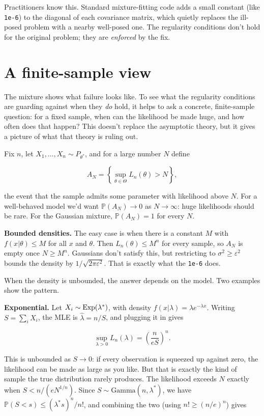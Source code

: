 \documentclass{article}
\begin{document}
Practitioners know this. Standard mixture-fitting code adds a small constant (like \texttt{1e-6}) to the diagonal of each covariance matrix, which quietly replaces the ill-posed problem with a nearby well-posed one. The regularity conditions don't hold for the original problem; they are \emph{enforced} by the fix.

\section{A finite-sample view}

The mixture shows what failure looks like. To see what the regularity conditions are guarding against when they \emph{do} hold, it helps to ask a concrete, finite-sample question: for a fixed sample, when can the likelihood be made huge, and how often does that happen? This doesn't replace the asymptotic theory, but it gives a picture of what that theory is ruling out.

Fix $n$, let $X_1,\dots,X_n \sim P_{\theta^*}$, and for a large number $N$ define

\[A_N = \left\{\sup_{\theta \in\Theta} L_n(\theta) > N \right\},\]

the event that the sample admits some parameter with likelihood above $N$. For a well-behaved model we'd want $\mathbb{P}(A_N) \to 0$ as $N \to \infty$: huge likelihoods should be rare. For the Gaussian mixture, $\mathbb{P}(A_N) = 1$ for every $N$.

\textbf{Bounded densities.} The easy case is when there is a constant $M$ with $f(x|\theta) \le M$ for all $x$ and $\theta$. Then $L_n(\theta) \le M^n$ for every sample, so $A_N$ is empty once $N \ge M^n$. Gaussians don't satisfy this, but restricting to $\sigma^2 \ge \varepsilon^2$ bounds the density by $1/\sqrt{2\pi\varepsilon^2}$. That is exactly what the \texttt{1e-6} does.

When the density is unbounded, the answer depends on the model. Two examples show the pattern.

\textbf{Exponential.} Let $X_i \sim {\rm Exp}(\lambda^*)$, with density $f(x|\lambda)=\lambda e^{-\lambda x}$. Writing $S = \sum_i X_i$, the MLE is $\hat\lambda = n/S$, and plugging it in gives

\[\sup_{\lambda > 0} L_n(\lambda) = \left(\frac{n}{eS}\right)^n.\]

This is unbounded as $S \to 0$: if every observation is squeezed up against zero, the likelihood can be made as large as you like. But that is exactly the kind of sample the true distribution rarely produces. The likelihood exceeds $N$ exactly when $S < n/(e N^{1/n})$. Since $S \sim \mathrm{Gamma}(n, \lambda^*)$, we have $\mathbb{P}(S < s) \le (\lambda^* s)^n/n!$, and combining the two (using $n! \ge (n/e)^n$) gives
\end{document}
